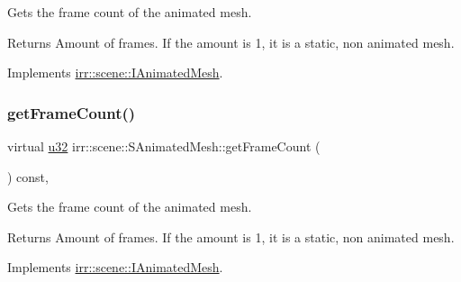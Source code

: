 Gets the frame count of the animated mesh. 

\begin{DoxyReturn}{Returns}
Amount of frames. If the amount is 1, it is a static, non animated mesh. 
\end{DoxyReturn}


Implements \hyperlink{classirr_1_1scene_1_1IAnimatedMesh_a2ec99aba081e9f37802e8ea9cd65629b}{irr\+::scene\+::\+I\+Animated\+Mesh}.

\mbox{\label{structirr_1_1scene_1_1SAnimatedMesh_a58d8940d3002792194c74e209a5f2949}} 
\subsubsection{\texorpdfstring{get\+Frame\+Count()}{getFrameCount()}\hspace{0.1cm}{\footnotesize\ttfamily [2/2]}}
{\footnotesize\ttfamily virtual \hyperlink{namespaceirr_a0416a53257075833e7002efd0a18e804}{u32} irr\+::scene\+::\+S\+Animated\+Mesh\+::get\+Frame\+Count (\begin{DoxyParamCaption}{ }\end{DoxyParamCaption}) const\hspace{0.3cm}{\ttfamily [inline]}, {\ttfamily [virtual]}}



Gets the frame count of the animated mesh. 

\begin{DoxyReturn}{Returns}
Amount of frames. If the amount is 1, it is a static, non animated mesh. 
\end{DoxyReturn}


Implements \hyperlink{classirr_1_1scene_1_1IAnimatedMesh_a2ec99aba081e9f37802e8ea9cd65629b}{irr\+::scene\+::\+I\+Animated\+Mesh}.

\mbox{\label{structirr_1_1scene_1_1SAnimatedMesh_a132d5f643fe02b57480d945e8d5be2d2}} 
